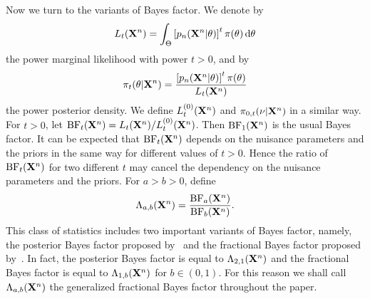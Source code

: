 \documentclass[11pt]{article}
\theoremstyle{plain}
\theoremstyle{definition}
\theoremstyle{remark}
\begin{document}
Now we turn to the variants of Bayes factor.
We denote by
\begin{align*}
L_t(\mathbf{X}^{n})=\int_{\Theta}\left[p_n(\mathbf{X}^{n}|\theta)\right]^t \pi(\theta)\, \mathrm d\theta
\end{align*}
the power marginal likelihood with power $t>0$,
and by 
\begin{align*}
    \pi_t (\theta | \mathbf{X}^n) = \frac{\left[p_n(\mathbf{X}^{n}|\theta)\right]^t \pi(\theta)}{ L_t (\mathbf{X}^n) }
\end{align*}
the power posterior density.
We define $L_t^{(0)}(\mathbf{X}^{n})$ and $\pi_{0, t} (\nu | \mathbf{X}^n)$ in a similar way.
For $t > 0$, let $\text{BF}_t (\mathbf{X}^n) = L_t(\mathbf{X}^n)/ L_t^{(0)} (\mathbf{X}^n)$.
Then $\text{BF}_1(\mathbf{X}^n)$ is the usual Bayes factor.
It can be expected that $\text{BF}_t (\mathbf{X}^n)$ depends on the nuisance parameters and the priors in the same way for different values of $t>0$.
Hence the ratio of $\text{BF}_t (\mathbf{X}^n)$ for two different $t$ may cancel the dependency on the nuisance parameters and the priors.
For $a>b>0$, define
\begin{align*}
\Lambda_{a,b} (\mathbf{X}^n) =
\frac{\text{BF}_a (\mathbf{X}^n)}
{\text{BF}_b (\mathbf{X}^n)}
    .
\end{align*}
    This class of statistics includes two important variants of Bayes factor, namely, the posterior Bayes factor proposed by~\cite{Aitkin1991Posterior} and the fractional Bayes factor proposed by~\cite{Fractional1995}.
    In fact, the posterior Bayes factor is equal to $\Lambda_{2,1}(\mathbf{X}^n)$ and the fractional Bayes factor is equal to $\Lambda_{1,b}(\mathbf{X}^n)$ for $b\in (0,1)$.
    For this reason we shall call $\Lambda_{a,b} (\mathbf{X}^n)$ the generalized fractional Bayes factor throughout the paper.
\end{document}
